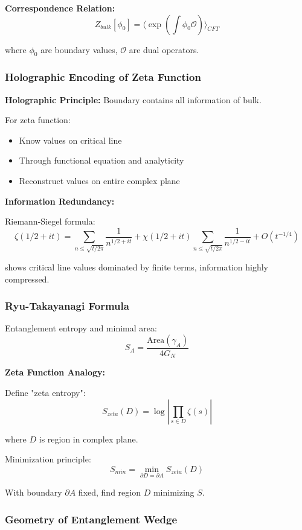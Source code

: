 \documentclass[11pt]{article}
\theoremstyle{plain}
\theoremstyle{definition}
\theoremstyle{remark}
\begin{document}
\textbf{Correspondence Relation:}
$$Z_{bulk}[\phi_0] = \langle \exp\left(\int \phi_0 \mathcal{O} \right) \rangle_{CFT}$$

where $\phi_0$ are boundary values, $\mathcal{O}$ are dual operators.

\subsubsection{Holographic Encoding of Zeta Function}

\textbf{Holographic Principle:} Boundary contains all information of bulk.

For zeta function:
\begin{itemize}
\item Know values on critical line
\item Through functional equation and analyticity
\item Reconstruct values on entire complex plane
\end{itemize}

\textbf{Information Redundancy:}

Riemann-Siegel formula:
$$\zeta(1/2 + it) = \sum_{n \leq \sqrt{t/2\pi}} \frac{1}{n^{1/2 + it}} + \chi(1/2 + it) \sum_{n \leq \sqrt{t/2\pi}} \frac{1}{n^{1/2 - it}} + O(t^{-1/4})$$

shows critical line values dominated by finite terms, information highly compressed.

\subsubsection{Ryu-Takayanagi Formula}

Entanglement entropy and minimal area:
$$S_A = \frac{\text{Area}(\gamma_A)}{4G_N}$$

\textbf{Zeta Function Analogy:}

Define "zeta entropy":
$$S_{zeta}(D) = \log \left| \prod_{s \in D} \zeta(s) \right|$$

where $D$ is region in complex plane.

Minimization principle:
$$S_{min} = \min_{\partial D = \partial A} S_{zeta}(D)$$

With boundary $\partial A$ fixed, find region $D$ minimizing $S$.

\subsubsection{Geometry of Entanglement Wedge}
\end{document}
